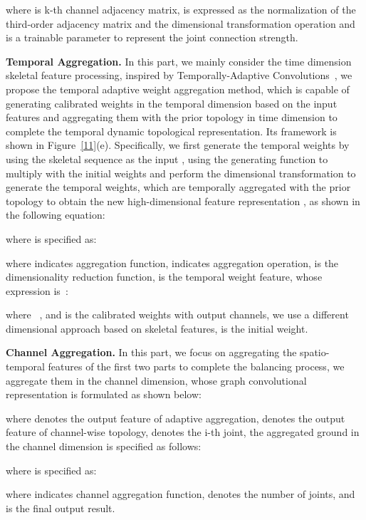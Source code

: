 \documentclass[letterpaper]{article} \usepackage[submission]{aaai23}  \usepackage{times}  \usepackage{helvet}  \usepackage{courier}  \usepackage[hyphens]{url}  \usepackage{graphicx} \urlstyle{rm} \def\UrlFont{\rm}  \usepackage{natbib}  \usepackage{caption} \frenchspacing  \setlength{\pdfpagewidth}{8.5in} \setlength{\pdfpageheight}{11in} \usepackage{algorithm}
\begin{document}
where  is k-th channel adjacency matrix,  is expressed as the normalization of the third-order adjacency matrix and the dimensional transformation operation and  is a trainable parameter to represent the joint connection strength.





\noindent
{\bf Temporal Aggregation.} In this part, we mainly consider the time dimension skeletal feature processing, inspired by Temporally-Adaptive Convolutions~\cite{DBLP:journals/corr/abs-2110-06178}, we propose the temporal adaptive weight aggregation method, which is capable of generating calibrated weights in the temporal dimension based on the input features and aggregating them with the prior topology in time dimension to complete the temporal dynamic topological representation. Its framework is shown in Figure~\ref{11}(e). Specifically, we first generate the temporal weights by using the skeletal sequence as the input , using the generating function to multiply with the initial weights and perform the dimensional transformation to generate the temporal weights, which are temporally aggregated with the prior topology to obtain the new high-dimensional feature representation , as shown in the following equation:


where  is specified as:


where  indicates aggregation function,  indicates aggregation operation,  is the dimensionality reduction function,  is the temporal weight feature, whose expression is~\cite{DBLP:journals/corr/abs-2110-06178}:


where ~\cite{DBLP:journals/corr/abs-2110-06178}, and  is the calibrated weights with output channels, we use a different dimensional approach based on skeletal features,  is the initial weight.


\noindent
{\bf Channel Aggregation.} In this part, we focus on aggregating the spatio-temporal features of the first two parts to complete the balancing process, we aggregate them in the channel dimension, whose graph convolutional representation is formulated as shown below:


where  denotes the output feature of adaptive aggregation,  denotes the output feature of channel-wise topology,  denotes the i-th joint, the aggregated ground in the channel dimension is specified as follows:


where  is specified as:


where  indicates channel aggregation function,  denotes the number of joints, and  is the final output result.
\end{document}
